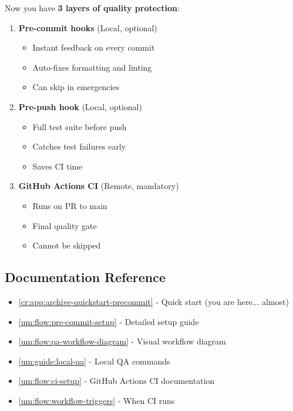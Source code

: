 \begin{record}

Now you have \textbf{3 layers of quality protection}:

\begin{enumerate}
\def\labelenumi{\arabic{enumi}.}
\item
  \textbf{Pre-commit hooks} (Local, optional)

  \begin{itemize}
  \tightlist
  \item
    Instant feedback on every commit
  \item
    Auto-fixes formatting and linting
  \item
    Can skip in emergencies
  \end{itemize}
\item
  \textbf{Pre-push hook} (Local, optional)

  \begin{itemize}
  \tightlist
  \item
    Full test suite before push
  \item
    Catches test failures early
  \item
    Saves CI time
  \end{itemize}
\item
  \textbf{GitHub Actions CI} (Remote, mandatory)

  \begin{itemize}
  \tightlist
  \item
    Runs on PR to main
  \item
    Final quality gate
  \item
    Cannot be skipped
  \end{itemize}
\end{enumerate}

\end{record}

\subsection{Documentation Reference}\label{cr:app:archive-pre-commit-setup-summary:documentation-reference}

\begin{record}

\begin{itemize}
\tightlist
\item
  \cref{cr:app:archive-quickstart-precommit} - Quick start (you are here... almost)
\item
  \cref{um:flow:pre-commit-setup} - Detailed setup guide
\item
  \cref{um:flow:qa-workflow-diagram} - Visual workflow diagram
\item
  \cref{um:guide:local-qa} - Local QA commands
\item
  \cref{um:flow:ci-setup} - GitHub Actions CI documentation
\item
  \cref{um:flow:workflow-triggers} - When CI runs
\end{itemize}

\end{record}

